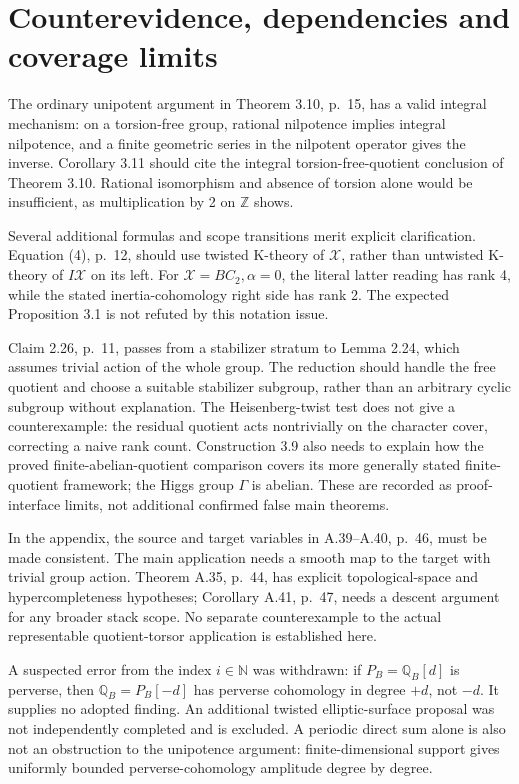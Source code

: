 \documentclass[10pt]{article}
\begin{document}
\section*{Counterevidence, dependencies and coverage limits}
The ordinary unipotent argument in Theorem 3.10, p. 15, has a valid integral mechanism: on a torsion-free group, rational nilpotence implies integral nilpotence, and a finite geometric series in the nilpotent operator gives the inverse. Corollary 3.11 should cite the integral torsion-free-quotient conclusion of Theorem 3.10. Rational isomorphism and absence of torsion alone would be insufficient, as multiplication by 2 on \(\mathbb Z\) shows.\par
Several additional formulas and scope transitions merit explicit clarification. Equation (4), p. 12, should use twisted K-theory of \(\mathcal X\), rather than untwisted K-theory of \(I\mathcal X\) on its left. For \(\mathcal X=BC_2,\alpha=0\), the literal latter reading has rank 4, while the stated inertia-cohomology right side has rank 2. The expected Proposition 3.1 is not refuted by this notation issue.\par
Claim 2.26, p. 11, passes from a stabilizer stratum to Lemma 2.24, which assumes trivial action of the whole group. The reduction should handle the free quotient and choose a suitable stabilizer subgroup, rather than an arbitrary cyclic subgroup without explanation. The Heisenberg-twist test does not give a counterexample: the residual quotient acts nontrivially on the character cover, correcting a naive rank count. Construction 3.9 also needs to explain how the proved finite-abelian-quotient comparison covers its more generally stated finite-quotient framework; the Higgs group \(\Gamma\) is abelian. These are recorded as proof-interface limits, not additional confirmed false main theorems.\par
In the appendix, the source and target variables in A.39–A.40, p. 46, must be made consistent. The main application needs a smooth map to the target with trivial group action. Theorem A.35, p. 44, has explicit topological-space and hypercompleteness hypotheses; Corollary A.41, p. 47, needs a descent argument for any broader stack scope. No separate counterexample to the actual representable quotient-torsor application is established here.\par
A suspected error from the index \(i\in\mathbb N\) was withdrawn: if \(P_B=\mathbb Q_B[d]\) is perverse, then \(\mathbb Q_B=P_B[-d]\) has perverse cohomology in degree \(+d\), not \(-d\). It supplies no adopted finding. An additional twisted elliptic-surface proposal was not independently completed and is excluded. A periodic direct sum alone is also not an obstruction to the unipotence argument: finite-dimensional support gives uniformly bounded perverse-cohomology amplitude degree by degree.\par
\end{document}
